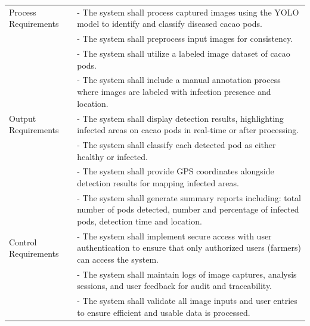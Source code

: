 \begin{longtable}{p{4cm} p{8cm}}
	Process Requirements     & - The system shall process captured images using the YOLO model to identify and classify diseased cacao pods.                                              \\
	                         & - The system shall preprocess input images for consistency.                                                                                                \\
	                         & - The system shall utilize a labeled image dataset of cacao pods.                                                                                          \\
	                         & - The system shall include a manual annotation process where images are labeled with infection presence and location.                                      \\
	\midrule

	Output Requirements      & - The system shall display detection results, highlighting infected areas on cacao pods in real-time or after processing.                                  \\
	                         & - The system shall classify each detected pod as either healthy or infected.                                                                               \\
	                         & - The system shall provide GPS coordinates alongside detection results for mapping infected areas.                                                         \\
	                         & - The system shall generate summary reports including: total number of pods detected, number and percentage of infected pods, detection time and location. \\
	\midrule

	Control Requirements     & - The system shall implement secure access with user authentication to ensure that only authorized users (farmers) can access the system.                  \\
	                         & - The system shall maintain logs of image captures, analysis sessions, and user feedback for audit and traceability.                                       \\
	                         & - The system shall validate all image inputs and user entries to ensure efficient and usable data is processed.                                             \\
	\midrule


\end{longtable}

